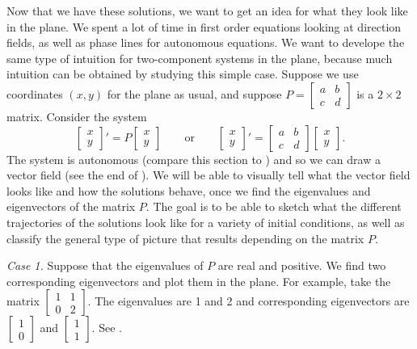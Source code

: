 Now that we have these solutions, we want to get an idea for what they look like in the plane. We spent a lot of time in first order equations looking at direction fields, as well as phase lines for autonomous equations. We want to develope the same type of intuition for two-component systems in the plane, because much intuition can be obtained by studying this simple case.
Suppose we use coordinates $(x,y)$ for the plane as usual,
and suppose
$P = \left[ \begin{smallmatrix} a & b \\ c & d \end{smallmatrix} \right]$ 
is a $2 \times 2$ matrix.  Consider the system
\begin{equation} \label{pln:eq}
\begin{bmatrix} x \\ y \end{bmatrix} ' =
P \begin{bmatrix} x \\ y \end{bmatrix} 
\qquad 
\text{or}
\qquad
\begin{bmatrix} x \\ y \end{bmatrix} ' =
\begin{bmatrix} a & b \\ c & d \end{bmatrix} 
\begin{bmatrix} x \\ y \end{bmatrix} 
.
\end{equation}
The system is autonomous (compare this section
to )
and so we can draw a vector field (see the end of
).
We will be able to visually tell what the vector field looks like and
how the solutions behave, once we find 
the eigenvalues and eigenvectors of the matrix $P$. The goal is to be able to sketch what the different trajectories of the solutions look like for a variety of initial conditions, as well as classify the general type of picture that results depending on the matrix $P$. 

\medskip

\emph{Case 1.}  Suppose that the eigenvalues of $P$ are real and positive.
We find two corresponding eigenvectors and plot them in the plane.  For
example, take the
matrix $\left[ \begin{smallmatrix} 1 & 1 \\ 0 & 2 \end{smallmatrix}
\right]$.
The eigenvalues are 1 and 2 and corresponding eigenvectors are
$\left[ \begin{smallmatrix} 1 \\ 0 \end{smallmatrix} \right]$ and
$\left[ \begin{smallmatrix} 1 \\ 1 \end{smallmatrix} \right]$.  See
.

